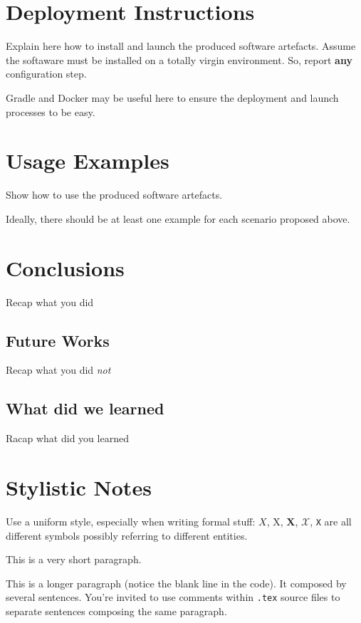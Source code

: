 \documentclass{scrartcl}
\begin{document}
\section{Deployment Instructions}

Explain here how to install and launch the produced software artefacts.
%
Assume the softaware must be installed on a totally virgin environment.
%
So, report \textbf{any} configuration step.

Gradle and Docker may be useful here to ensure the deployment and launch processes to be easy.

\section{Usage Examples}

Show how to use the produced software artefacts.

Ideally, there should be at least one example for each scenario proposed above.

\section{Conclusions}

Recap what you did

\subsection{Future Works}

Recap what you did \emph{not}

\subsection{What did we learned}

Racap what did you learned

\section*{Stylistic Notes}

Use a uniform style, especially when writing formal stuff: $X$, X, $\mathbf{X}$, $\mathcal{X}$, \texttt{X} are all different symbols possibly referring to different entities. 

This is a very short paragraph.

This is a longer paragraph (notice the blank line in the code).
It composed by several sentences.
%
You're invited to use comments within \texttt{.tex} source files to separate sentences composing the same paragraph.
\end{document}
